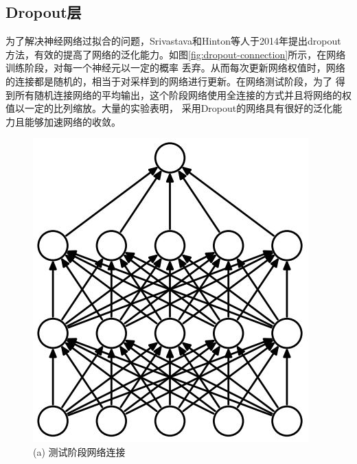 \subsection{Dropout层}
	为了解决神经网络过拟合的问题，Srivastava和Hinton等人\cite{srivastava2014dropout}于2014年提出dropout
	方法，有效的提高了网络的泛化能力。如图\ref{fig:dropout-connection}所示，在网络训练阶段，对每一个神经元以一定的概率
	丢弃。从而每次更新网络权值时，网络的连接都是随机的，相当于对采样到的网络进行更新。在网络测试阶段，为了
	得到所有随机连接网络的平均输出，这个阶段网络使用全连接的方式并且将网络的权值以一定的比列缩放。大量的实验表明，
	采用Dropout的网络具有很好的泛化能力且能够加速网络的收敛。
	\begin{figure}[!htp]    
\begin{minipage}[t]{0.5\linewidth}%
	\centering    
	\includegraphics[width=0.9\linewidth]{figure/chap4/no-dropout.jpg}    
	\caption*{(a) 测试阶段网络连接 }
	\label{fig:no-dropout}    
\end{minipage}    
\begin{minipage}[t]{0.5\linewidth}%
	\centering    

\end{minipage}
\end{figure}
